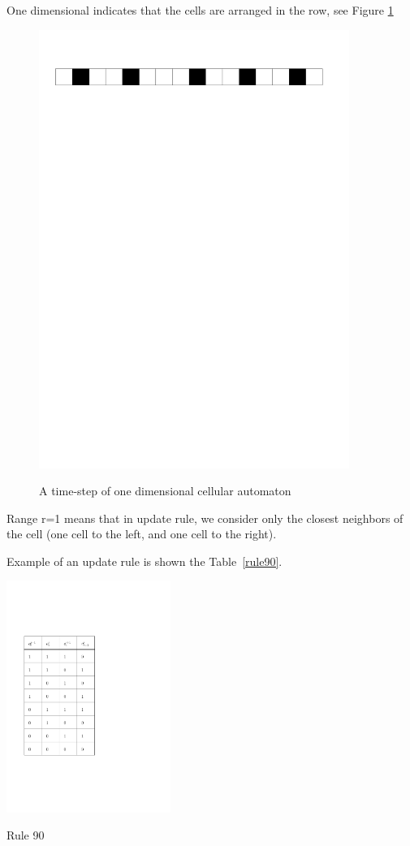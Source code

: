 One dimensional indicates that the cells are arranged in the row, see Figure \ref{1d}

\begin{figure}[htbp]
 \centering 
 \includegraphics[width=0.9\textwidth]{./img/1Dline}
 \label{1d}
 \caption{A time-step of one dimensional cellular automaton}
\end{figure}

Range r=1 means that in update rule, we consider only the closest neighbors of the cell (one cell to the left, and one cell to the right).

Example of an update rule is shown the Table~\ref{rule90}.\\

\begin{table}[htbp]
 \centering
 \includegraphics[width=0.4\textwidth]{./img/1Drule}
 \caption{Rule 90}
 \label{rule90}
\end{table}

